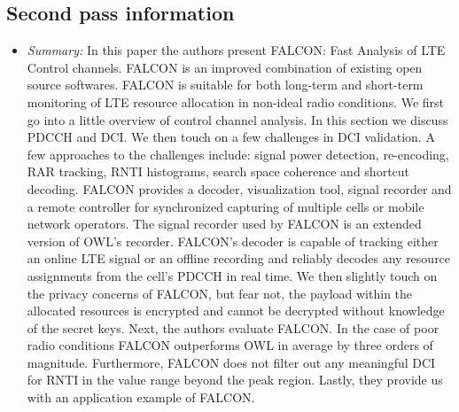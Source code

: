 \documentclass[letterpaper,twocolumn,10pt]{article}
\begin{document}
\subsection{Second pass information}
\label{sec:second}
\begin{itemize}

\item {\it Summary:}
In this paper the authors present FALCON: Fast Analysis of LTE Control channels. FALCON is an 
improved combination of existing open source softwares. FALCON is suitable for both long-term 
and short-term monitoring of LTE resource allocation in non-ideal radio conditions. We first go into
a little overview of control channel analysis. In this section we discuss PDCCH and DCI. We then 
touch on a few challenges in DCI validation. A few approaches to the challenges include: signal
power detection, re-encoding, RAR tracking, RNTI histograms, search space coherence and 
shortcut decoding. FALCON provides a decoder, visualization tool, signal recorder and a remote 
controller for synchronized capturing of multiple cells or mobile network operators. The signal 
recorder used by FALCON is an extended version of OWL's recorder. FALCON's decoder is 
capable of tracking either an online LTE signal or an offline recording and reliably decodes any 
resource assignments from the cell's PDCCH in real time. We then slightly touch on the privacy 
concerns of FALCON, but fear not, the payload within the allocated resources is encrypted and 
cannot be decrypted without knowledge of the secret keys. Next, the authors evaluate FALCON.
In the case of poor radio conditions FALCON outperforms OWL in average by three orders of 
magnitude. Furthermore, FALCON does not filter out any meaningful DCI for RNTI in the value 
range beyond the peak region. Lastly, they provide us with an application example of FALCON.

\end{itemize}
\end{document}
